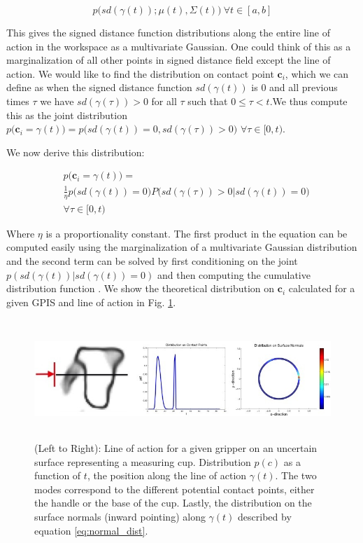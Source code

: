 \documentclass[letterpaper, 10 pt, conference]{ieeeconf}  %
\begin{document}
\vspace{-2ex}
\begin{equation} \label{eq:line_of_act_dist}
p\big(sd(\gamma(t)) ; \mu(t),\Sigma(t)\big) \ \forall t \in [a,b] 
\end{equation}

This gives the signed distance function distributions along the entire line of action in the workspace as a multivariate Gaussian. One could think of this as a marginalization of all other points in signed distance field except the line of action. We would like to find the distribution on contact point $\textbf{c}_i$, which we can define as when the signed distance function $sd(\gamma(t))$ is $0$ and all previous times $\tau$ we have $sd(\gamma(\tau)) > 0$ for all $\tau$ such that $0 \leq \tau < t$.We thus compute this as the joint distribution $p\big( \textbf{c}_i= \gamma(t)\big) = p\big(sd(\gamma(t))=0, sd(\gamma(\tau))> 0 \big)$ $  \forall \tau \in [0,t)$.

We now derive this distribution: 

\vspace{-2ex}
\begin{align}
 & p\big(\textbf{c}_i = \gamma(t)\big) = \label{eq:contact_theory} \\
  & \frac{1}{\eta} p\big(sd(\gamma(t)) = 0\big)P\big(sd(\gamma(\tau)) > 0 | sd(\gamma(t)) = 0\big) \\
  & \forall \tau \in [0,t)
\end{align}


Where $\eta$ is a proportionality constant. The first product in the equation can be computed easily using the marginalization of a multivariate Gaussian distribution and the second term can be solved by first conditioning on the joint $p(sd(\gamma(t))|sd(\gamma(t)) = 0)$ and then computing the cumulative distribution function  \cite{petersen2008matrix}.  We show the theoretical distribution on $\textbf{c}_i$ calculated for a given GPIS and line of action in Fig.
\ref{fig:GraspDist}.

\begin{figure}[ht!]
\centering
\includegraphics[width = 17cm, height = 4.5cm]{figures/Slide04.jpg}
\caption{ \footnotesize (Left to Right): Line of action for a given gripper on an uncertain surface representing a measuring cup. Distribution $p(c)$ as a function of $t$, the position along the line of action $\gamma(t)$. The two modes correspond to the different potential contact points, either the handle or the base of the cup. Lastly, the distribution on the surface normals (inward pointing) along $\gamma(t)$ described by equation \ref{eq:normal_dist}. }
\vspace*{-10pt}
\label{fig:GraspDist}
\end{figure}
\end{document}
